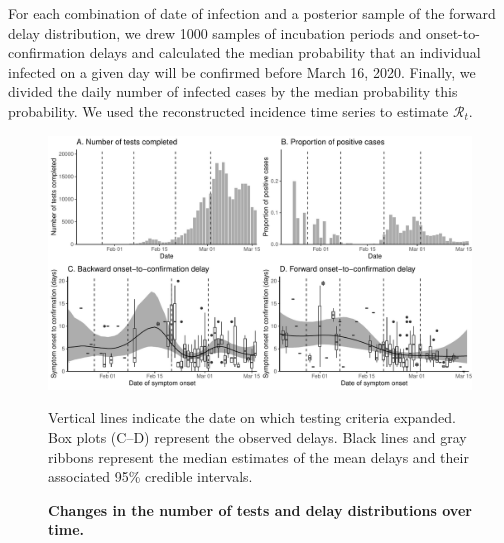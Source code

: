 For each combination of date of infection and a posterior sample of the forward delay distribution, we drew 1000 samples of incubation periods and onset-to-confirmation delays and calculated the median probability that an individual infected on a given day will be confirmed before March 16, 2020.
Finally, we divided the daily number of infected cases by the median probability this probability.
We used the reconstructed incidence time series to estimate $\mathcal R_t$.

\pagebreak

\begin{figure}[!ht]
\includegraphics[width=\textwidth]{figure_report_delay.pdf}
\caption{
\textbf{Changes in the number of tests and delay distributions over time.}
}
Vertical lines indicate the date on which testing criteria expanded.
Box plots (C--D) represent the observed delays.
Black lines and gray ribbons represent the median estimates of the mean delays and their associated 95\% credible intervals.
\end{figure}

\pagebreak

